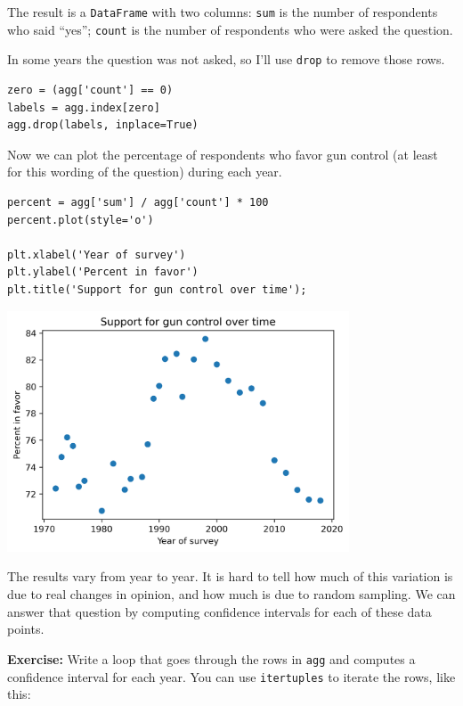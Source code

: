 The result is a \passthrough{\lstinline!DataFrame!} with two columns:
\passthrough{\lstinline!sum!} is the number of respondents who said
``yes''; \passthrough{\lstinline!count!} is the number of respondents
who were asked the question.

In some years the question was not asked, so I'll use
\passthrough{\lstinline!drop!} to remove those rows.

\begin{lstlisting}[]
zero = (agg['count'] == 0)
labels = agg.index[zero]
agg.drop(labels, inplace=True)
\end{lstlisting}

Now we can plot the percentage of respondents who favor gun control (at
least for this wording of the question) during each year.

\begin{lstlisting}[]
percent = agg['sum'] / agg['count'] * 100
percent.plot(style='o')

plt.xlabel('Year of survey')
plt.ylabel('Percent in favor')
plt.title('Support for gun control over time');
\end{lstlisting}

\begin{center}
\includegraphics[width=4in]{11_resampling_files/11_resampling_94_0.png}
\end{center}

The results vary from year to year. It is hard to tell how much of this
variation is due to real changes in opinion, and how much is due to
random sampling. We can answer that question by computing confidence
intervals for each of these data points.

\textbf{Exercise:} Write a loop that goes through the rows in
\passthrough{\lstinline!agg!} and computes a confidence interval for
each year. You can use \passthrough{\lstinline!itertuples!} to iterate
the rows, like this:

